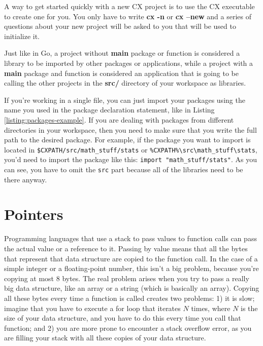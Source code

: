 \documentclass[11pt,fleqn,openany]{book} %
\begin{document}
A way to get started quickly with a new CX project is to use the CX executable to create one for you. You only have to write \textbf{cx -n} or \textbf{cx --new} and a series of questions about your new project will be asked to you that will be used to initialize it.

Just like in Go, a project without \textbf{main} package or function is considered a library to be imported by other packages or applications, while a project with a \textbf{main} package and function is considered an application that is going to be calling the other projects in the \textbf{src/} directory of your workspace as libraries.

If you're working in a single file, you can just import your packages using the name you used in the package declaration statement, like in Listing \ref{listing:packages-example}. If you are dealing with packages from different directories in your workspace, then you need to make sure that you write the full path to the desired package. For example, if the package you want to import is located in \lstinline{$CXPATH/src/math_stuff/stats} or \lstinline{%CXPATH%\src\math_stuff\stats}, you'd need to import the package like this: \lstinline{import "math_stuff/stats"}. As you can see, you have to omit the \lstinline{src} part because all of the libraries need to be there anyway.


\chapter{Pointers}
\label{chapter:pointers}

Programming languages that use a stack to pass values to function calls can pass the actual value or a reference to it. Passing by value means that all the bytes that represent that data structure are copied to the function call. In the case of a simple integer or a floating-point number, this isn't a big problem, because you're copying at most 8 bytes. The real problem arises when you try to pass a really big data structure, like an array or a string (which is basically an array). Copying all these bytes every time a function is called creates two problems: 1) it is slow; imagine that you have to execute a for loop that iterates $N$ times, where $N$ is the size of your data structure, and you have to do this every time you call that function; and 2) you are more prone to encounter a stack overflow error, as you are filling your stack with all these copies of your data structure.
\end{document}
